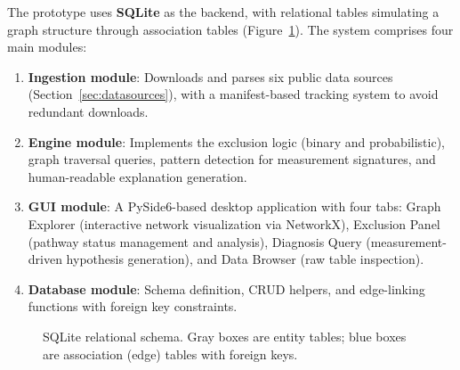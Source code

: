 \documentclass[12pt,a4paper]{article}
\begin{document}
The prototype uses \textbf{SQLite} as the backend, with relational tables simulating a graph structure through association tables (Figure~\ref{fig:schema_sql}). The system comprises four main modules:

\begin{enumerate}
    \item \textbf{Ingestion module}: Downloads and parses six public data sources (Section~\ref{sec:datasources}), with a manifest-based tracking system to avoid redundant downloads.
    \item \textbf{Engine module}: Implements the exclusion logic (binary and probabilistic), graph traversal queries, pattern detection for measurement signatures, and human-readable explanation generation.
    \item \textbf{GUI module}: A PySide6-based desktop application with four tabs: Graph Explorer (interactive network visualization via NetworkX), Exclusion Panel (pathway status management and analysis), Diagnosis Query (measurement-driven hypothesis generation), and Data Browser (raw table inspection).
    \item \textbf{Database module}: Schema definition, CRUD helpers, and edge-linking functions with foreign key constraints.
\end{enumerate}

\begin{figure}[H]
\centering
{}
\caption{SQLite relational schema. Gray boxes are entity tables; blue boxes are association (edge) tables with foreign keys.}
\label{fig:schema_sql}
\end{figure}
\end{document}
